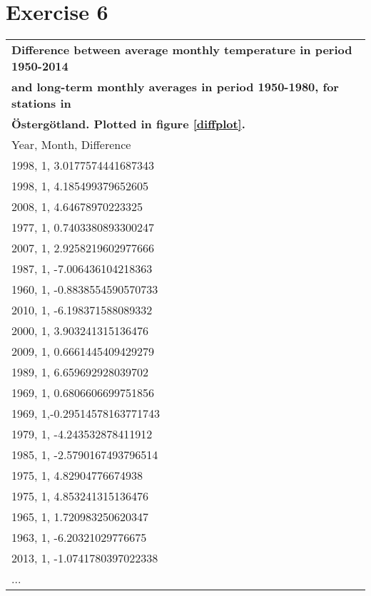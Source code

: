 \documentclass[a4paper,titlepage,12pt]{article}
\begin{document}
\section{Exercise 6}
\begin{tabular}{l}
  \bf Difference between average monthly temperature in period 1950-2014 \\
  \bf and long-term monthly averages in period 1950-1980, for stations in \\
  \bf Östergötland. Plotted in figure \ref{diffplot}. \\ 
  Year, Month, Difference \\
  \hline
  1998,    1,  3.0177574441687343 \\ 
  1998,    1,   4.185499379652605 \\ 
  2008,    1,    4.64678970223325 \\
  1977,    1,  0.7403380893300247 \\
  2007,    1,  2.9258219602977666 \\
  1987,    1,  -7.006436104218363 \\
  1960,    1, -0.8838554590570733 \\
  2010,    1,  -6.198371588089332 \\
  2000,    1,   3.903241315136476 \\
  2009,    1,  0.6661445409429279 \\
  1989,    1,   6.659692928039702 \\
  1969,    1,  0.6806606699751856 \\
  1969,    1,-0.29514578163771743 \\
  1979,    1,  -4.243532878411912 \\
  1985,    1, -2.5790167493796514 \\
  1975,    1,    4.82904776674938 \\
  1975,    1,   4.853241315136476 \\
  1965,    1,   1.720983250620347 \\
  1963,    1,   -6.20321029776675 \\
  2013,    1, -1.0741780397022338 \\
  ... \\
\end{tabular}
\end{document}
